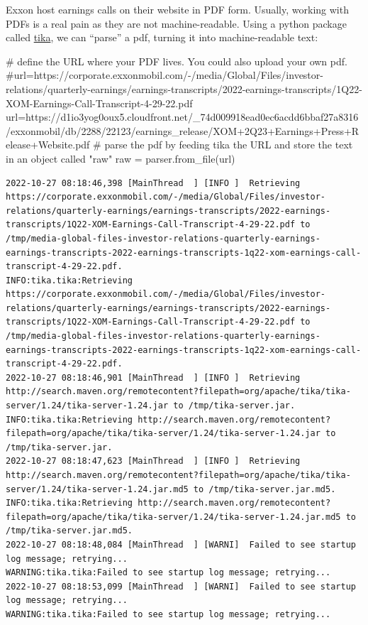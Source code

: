 \documentclass[
  letterpaper,
  DIV=11,
  numbers=noendperiod]{scrreprt}
\newenvironment{Shaded}{\begin{snugshade}}{\end{snugshade}}
\newcommand{\CommentTok}[1]{\textcolor[rgb]{0.37,0.37,0.37}{#1}}
\newcommand{\NormalTok}[1]{\textcolor[rgb]{0.00,0.23,0.31}{#1}}
\newcommand{\OperatorTok}[1]{\textcolor[rgb]{0.37,0.37,0.37}{#1}}
\newcommand{\StringTok}[1]{\textcolor[rgb]{0.13,0.47,0.30}{#1}}
\begin{document}
Exxon host earnings calls on their website in PDF form. Usually, working
with PDFs is a real pain as they are not machine-readable. Using a
python package called
\href{https://www.geeksforgeeks.org/parsing-pdfs-in-python-with-tika/}{tika},
we can ``parse'' a pdf, turning it into machine-readable text:

\begin{Shaded}
\begin{Highlighting}[]
\CommentTok{\# define the URL where your PDF lives. You could also upload your own pdf.}
\CommentTok{\#url=\textquotesingle{}https://corporate.exxonmobil.com/{-}/media/Global/Files/investor{-}relations/quarterly{-}earnings/earnings{-}transcripts/2022{-}earnings{-}transcripts/1Q22{-}XOM{-}Earnings{-}Call{-}Transcript{-}4{-}29{-}22.pdf\textquotesingle{}}
\NormalTok{url}\OperatorTok{=}\StringTok{\textquotesingle{}https://d1io3yog0oux5.cloudfront.net/\_74d009918ead0ec6acdd6bbaf27a8316/exxonmobil/db/2288/22123/earnings\_release/XOM+2Q23+Earnings+Press+Release+Website.pdf\textquotesingle{}}
\CommentTok{\# parse the pdf by feeding tika the URL and store the text in an object called "raw" }
\NormalTok{raw }\OperatorTok{=}\NormalTok{ parser.from\_file(url)}
\end{Highlighting}
\end{Shaded}

\begin{verbatim}
2022-10-27 08:18:46,398 [MainThread  ] [INFO ]  Retrieving https://corporate.exxonmobil.com/-/media/Global/Files/investor-relations/quarterly-earnings/earnings-transcripts/2022-earnings-transcripts/1Q22-XOM-Earnings-Call-Transcript-4-29-22.pdf to /tmp/media-global-files-investor-relations-quarterly-earnings-earnings-transcripts-2022-earnings-transcripts-1q22-xom-earnings-call-transcript-4-29-22.pdf.
INFO:tika.tika:Retrieving https://corporate.exxonmobil.com/-/media/Global/Files/investor-relations/quarterly-earnings/earnings-transcripts/2022-earnings-transcripts/1Q22-XOM-Earnings-Call-Transcript-4-29-22.pdf to /tmp/media-global-files-investor-relations-quarterly-earnings-earnings-transcripts-2022-earnings-transcripts-1q22-xom-earnings-call-transcript-4-29-22.pdf.
2022-10-27 08:18:46,901 [MainThread  ] [INFO ]  Retrieving http://search.maven.org/remotecontent?filepath=org/apache/tika/tika-server/1.24/tika-server-1.24.jar to /tmp/tika-server.jar.
INFO:tika.tika:Retrieving http://search.maven.org/remotecontent?filepath=org/apache/tika/tika-server/1.24/tika-server-1.24.jar to /tmp/tika-server.jar.
2022-10-27 08:18:47,623 [MainThread  ] [INFO ]  Retrieving http://search.maven.org/remotecontent?filepath=org/apache/tika/tika-server/1.24/tika-server-1.24.jar.md5 to /tmp/tika-server.jar.md5.
INFO:tika.tika:Retrieving http://search.maven.org/remotecontent?filepath=org/apache/tika/tika-server/1.24/tika-server-1.24.jar.md5 to /tmp/tika-server.jar.md5.
2022-10-27 08:18:48,084 [MainThread  ] [WARNI]  Failed to see startup log message; retrying...
WARNING:tika.tika:Failed to see startup log message; retrying...
2022-10-27 08:18:53,099 [MainThread  ] [WARNI]  Failed to see startup log message; retrying...
WARNING:tika.tika:Failed to see startup log message; retrying...
\end{verbatim}
\end{document}
